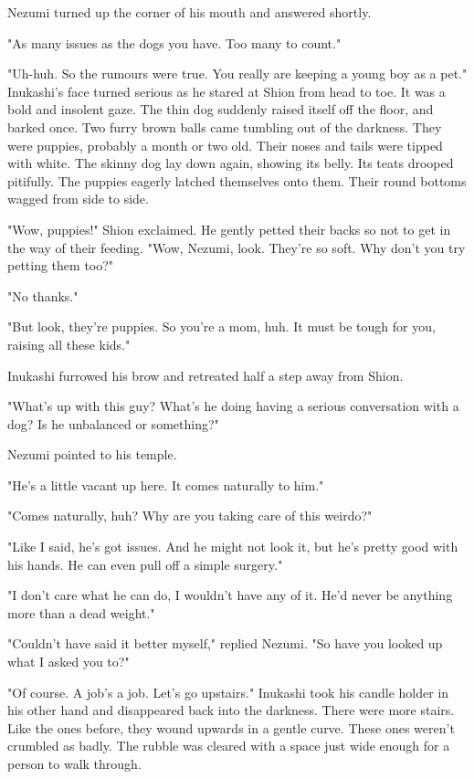 Nezumi turned up the corner of his mouth and answered shortly.

"As many issues as the dogs you have. Too many to count."

"Uh-huh. So the rumours were true. You really are keeping a young boy as
a pet." Inukashi's face turned serious as he stared at Shion from head
to toe. It was a bold and insolent gaze. The thin dog suddenly raised
itself off the floor, and barked once. Two furry brown balls came
tumbling out of the darkness. They were puppies, probably a month or two
old. Their noses and tails were tipped with white. The skinny dog lay
down again, showing its belly. Its teats drooped pitifully. The puppies
eagerly latched themselves onto them. Their round bottoms wagged from
side to side.

"Wow, puppies!" Shion exclaimed. He gently petted their backs so not to
get in the way of their feeding. "Wow, Nezumi, look. They're so soft.
Why don't you try petting them too?"

"No thanks."

"But look, they're puppies. So you're a mom, huh. It must be tough for
you, raising all these kids."

Inukashi furrowed his brow and retreated half a step away from Shion.

"What's up with this guy? What's he doing having a serious conversation
with a dog? Is he unbalanced or something?"

Nezumi pointed to his temple.

"He's a little vacant up here. It comes naturally to him."

"Comes naturally, huh? Why are you taking care of this weirdo?"

"Like I said, he's got issues. And he might not look it, but he's pretty
good with his hands. He can even pull off a simple surgery."

"I don't care what he can do, I wouldn't have any of it. He'd never be
anything more than a dead weight."

"Couldn't have said it better myself," replied Nezumi. "So have you
looked up what I asked you to?"

"Of course. A job's a job. Let's go upstairs." Inukashi took his candle
holder in his other hand and disappeared back into the darkness. There
were more stairs. Like the ones before, they wound upwards in a gentle
curve. These ones weren't crumbled as badly. The rubble was cleared with
a space just wide enough for a person to walk through.

